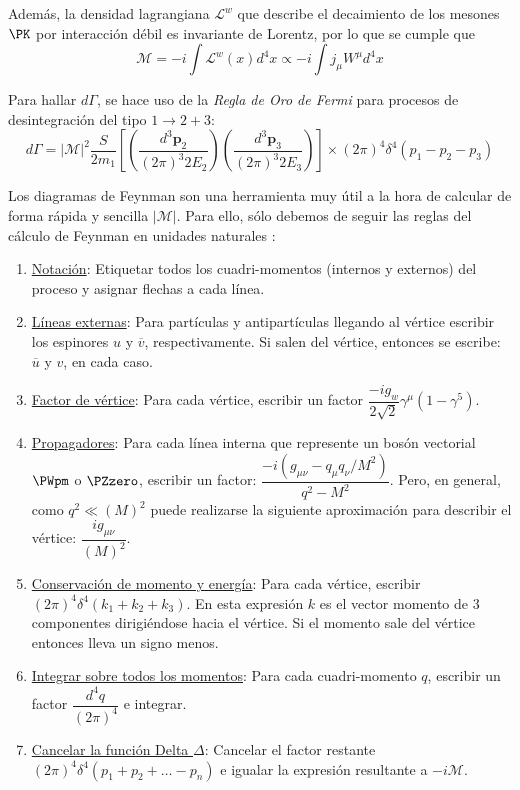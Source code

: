 Además, la densidad lagrangiana ${\mathcal{L}}^w$ que describe el decaimiento de los mesones $\PK$ por interacción débil es invariante de Lorentz, por lo que se cumple que \cite{Halzen}
\begin{equation}
\mathcal{M}=-i \int {\mathcal{L}}^w \left(x\right) d^{4}x \propto -i\int j_{\mu }W^{\mu }d^{4}x
\end{equation}

Para hallar $d\Gamma$, se hace uso de la \textit{Regla de Oro de Fermi} para procesos de desintegración del tipo $1 \rightarrow 2+3$:
\begin{equation}
d\Gamma =\left| \mathcal{M}\right| ^{2}\dfrac{S}{2m_{1}}\left[ \left( \dfrac{d^{3}\boldsymbol{p}_{2}}{\left( 2\pi \right) ^{3}2E_{2}}\right) \left( \dfrac{d^{3}\boldsymbol{p}_{3}}{\left( 2\pi \right) ^{3}2E_{3}}\right) \right] \times \left( 2\pi \right) ^{4}\delta ^{4}\left( p_{1}-p_{2}-p_{3}\right) 
\end{equation}

Los diagramas de Feynman son una herramienta muy útil a la hora de calcular de forma rápida y sencilla $\left| \mathcal{M}\right|$. Para ello, sólo debemos de seguir las reglas del cálculo de Feynman en unidades naturales \cite{Griffiths2008}:

\begin{enumerate}
\item \underline{Notación}: Etiquetar todos los cuadri-momentos (internos y externos) del proceso y asignar flechas a cada línea.
\item \underline{Líneas externas}: Para partículas y antipartículas llegando al vértice escribir los espinores $u$ y $\overline{v}$, respectivamente. Si salen del vértice, entonces se escribe: $\overline{u}$ y $v$, en cada caso.
\item \underline{Factor de vértice}: Para cada vértice, escribir un factor $\dfrac{-ig_{w}}{2\sqrt{2}}\gamma ^{\mu }\left( 1-\gamma ^{5}\right)$. 
\item \underline{Propagadores}: Para cada línea interna que represente un bosón vectorial $\PWpm$ o $\PZzero$, escribir un factor: 
$\dfrac{-i\left( g_{\mu\nu }-q_{\mu }q_{\nu }/M^{2}\right) }{q^{2}-M^{2}}$. Pero, en general, como $q^{2}\ll \left( M\right)^{2}$ puede realizarse la siguiente aproximación para describir el vértice: $\dfrac{ig_{\mu \nu }}{\left( M\right) ^{2}}$.
\item \underline{Conservación de momento y energía}: Para cada vértice, escribir $\left( 2\pi \right) ^{4}\delta ^{4}\left( k_{1}+k_{2}+k_{3}\right)$. En esta expresión $k$ es el vector momento de 3 componentes dirigiéndose hacia el vértice. Si el momento sale del vértice entonces lleva un signo menos.
\item \underline{Integrar sobre todos los momentos}: Para cada cuadri-momento $q$, escribir un factor $\dfrac{d^{4}q}{\left( 2\pi \right) ^{4}}$ e integrar.
\item \underline{Cancelar la función Delta $\Delta$}: Cancelar el factor restante $\left( 2\pi \right) ^{4}\delta ^{4}\left( p_{1}+p_{2}+\ldots -p_{n}\right)$ e igualar la expresión resultante a $-i\mathcal{M}$.
\end{enumerate}



